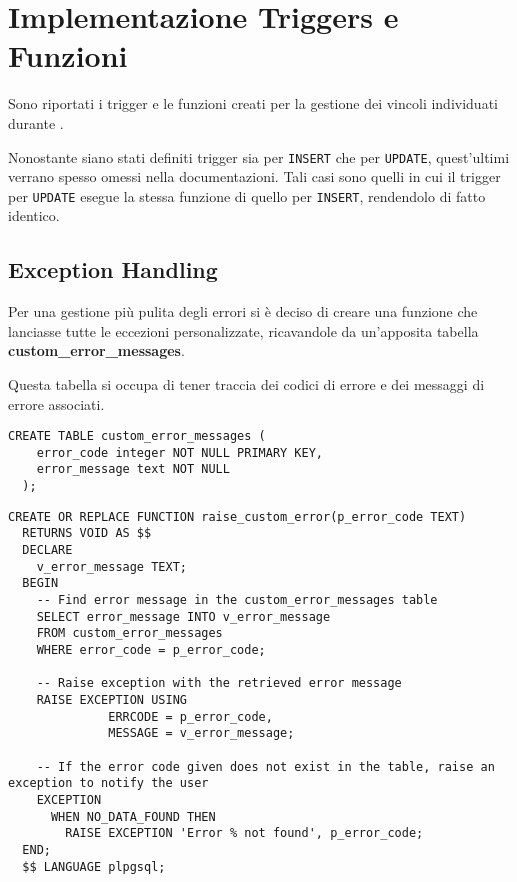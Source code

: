 \chapter{Implementazione Triggers e Funzioni}

Sono riportati i trigger e le funzioni creati per la gestione dei vincoli individuati durante .

Nonostante siano stati definiti trigger sia per \lstinline{INSERT} che per \lstinline{UPDATE}, quest'ultimi verrano spesso omessi nella documentazioni. Tali casi sono quelli in cui il trigger per \lstinline{UPDATE} esegue la stessa funzione di quello per \lstinline{INSERT}, rendendolo di fatto identico.

\section{Exception Handling}

Per una gestione più pulita degli errori si è deciso di creare una funzione che lanciasse tutte le eccezioni personalizzate, ricavandole da un'apposita tabella \textbf{custom\_error\_messages}.

Questa tabella si occupa di tener traccia dei codici di errore e dei messaggi di errore associati.

\begin{lstlisting}[caption={Creazione della tabella \textbf{custom\_error\_messages}}]
  CREATE TABLE custom_error_messages (
    error_code integer NOT NULL PRIMARY KEY,
    error_message text NOT NULL
  );
\end{lstlisting}

\begin{lstlisting}[caption={Creazione della funzione per gestire le eccezioni}]
  CREATE OR REPLACE FUNCTION raise_custom_error(p_error_code TEXT)
  RETURNS VOID AS $$
  DECLARE
    v_error_message TEXT;
  BEGIN
    -- Find error message in the custom_error_messages table 
    SELECT error_message INTO v_error_message
    FROM custom_error_messages
    WHERE error_code = p_error_code;
  
    -- Raise exception with the retrieved error message
    RAISE EXCEPTION USING 
              ERRCODE = p_error_code, 
              MESSAGE = v_error_message;
    
    -- If the error code given does not exist in the table, raise an exception to notify the user
    EXCEPTION
      WHEN NO_DATA_FOUND THEN
        RAISE EXCEPTION 'Error % not found', p_error_code;
  END;
  $$ LANGUAGE plpgsql;
\end{lstlisting}



